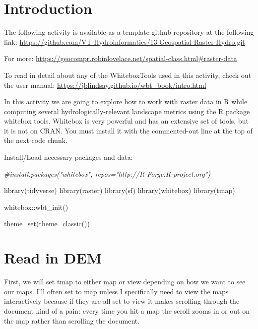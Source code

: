 \documentclass[
]{book}
\newenvironment{Shaded}{\begin{snugshade}}{\end{snugshade}}
\newcommand{\CommentTok}[1]{\textcolor[rgb]{0.56,0.35,0.01}{\textit{#1}}}
\newcommand{\FunctionTok}[1]{\textcolor[rgb]{0.00,0.00,0.00}{#1}}
\newcommand{\NormalTok}[1]{#1}
\newcommand{\SpecialCharTok}[1]{\textcolor[rgb]{0.00,0.00,0.00}{#1}}
\begin{document}
\hypertarget{introduction-2}{%
\section{Introduction}\label{introduction-2}}

The following activity is available as a template github repository at the following link: \url{https://github.com/VT-Hydroinformatics/13-Geospatial-Raster-Hydro.git}

For more: \url{https://geocompr.robinlovelace.net/spatial-class.html\#raster-data}

To read in detail about any of the WhiteboxTools used in this activity, check out the user manual: \url{https://jblindsay.github.io/wbt_book/intro.html}

In this activity we are going to explore how to work with raster data in R while computing several hydrologically-relevant landscape metrics using the R package whitebox tools. Whitebox is very powerful and has an extensive set of tools, but it is not on CRAN. You must install it with the commented-out line at the top of the next code chunk.

Install/Load necessary packages and data:

\begin{Shaded}
\begin{Highlighting}[]
\CommentTok{\#install.packages("whitebox", repos="http://R{-}Forge.R{-}project.org")}

\FunctionTok{library}\NormalTok{(tidyverse)}
\FunctionTok{library}\NormalTok{(raster)}
\FunctionTok{library}\NormalTok{(sf)}
\FunctionTok{library}\NormalTok{(whitebox)}
\FunctionTok{library}\NormalTok{(tmap)}

\NormalTok{whitebox}\SpecialCharTok{::}\FunctionTok{wbt\_init}\NormalTok{()}

\FunctionTok{theme\_set}\NormalTok{(}\FunctionTok{theme\_classic}\NormalTok{())}
\end{Highlighting}
\end{Shaded}

\hypertarget{read-in-dem}{%
\section{Read in DEM}\label{read-in-dem}}

First, we will set tmap to either map or view depending on how we want to see our maps. I'll often set to map unless I specifically need to view the maps interactively because if they are all set to view it makes scrolling through the document kind of a pain: every time you hit a map the scroll zooms in or out on the map rather than scrolling the document.
\end{document}
